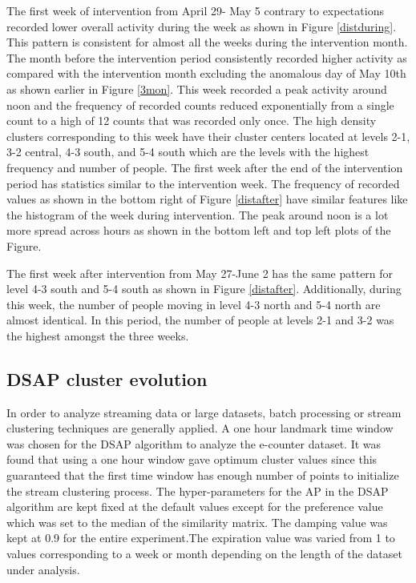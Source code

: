 The first week of intervention from April 29- May 5 contrary to expectations recorded lower overall activity during the week as shown in Figure \ref{distduring}. This pattern is consistent for almost all the weeks during the intervention month. The month before the intervention period consistently recorded higher activity as compared with the intervention month excluding the anomalous day of May 10th as shown earlier in Figure \ref{3mon}. This week recorded a peak activity around noon and the frequency of recorded counts reduced exponentially from a single count to a high of 12 counts that was recorded only once. The high density clusters corresponding to this week have their cluster centers located at levels 2-1, 3-2 central, 4-3 south, and 5-4 south which are the levels with the highest frequency and number of people. The first week after the end of the intervention period has statistics similar to the intervention week. The frequency of recorded values as shown in the bottom right of Figure \ref{distafter} have similar features like the histogram of the week during intervention. The peak around noon is a lot more spread across hours as shown in the bottom left and top left plots of the Figure.

The first week after intervention from May 27-June 2 has the same pattern for level 4-3 south and  5-4 south as shown in Figure \ref{distafter}. Additionally, during this week, the number of people moving in level 4-3 north and 5-4 north are almost identical. In this period, the number of people at levels 2-1 and 3-2 was the highest  amongst the three weeks. 
\subsection{DSAP cluster evolution}

In order to analyze streaming data or large datasets, batch processing or stream clustering techniques are generally applied. A one hour landmark time window was chosen for the DSAP algorithm to analyze the e-counter dataset. It was found that using a one hour window gave optimum cluster values since this guaranteed that the first time window has enough number of points to initialize the stream clustering process. The hyper-parameters for the AP in the DSAP algorithm are kept fixed at the default values except for the preference value which was set to the median of the similarity matrix. The damping value was kept at 0.9 for the entire experiment.The expiration value was varied from 1 to values corresponding to a week or month depending on the length of the dataset under analysis.%
 
